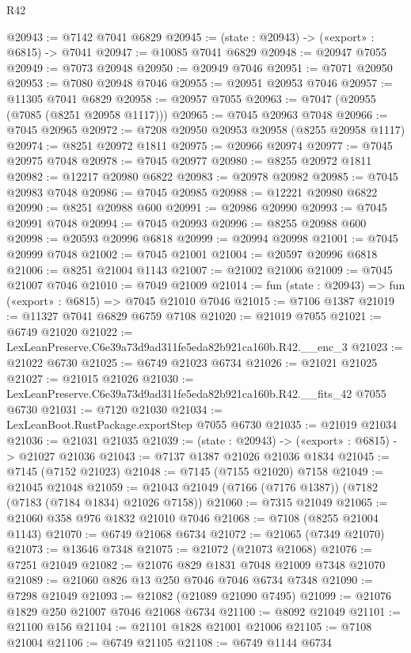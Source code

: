 \begin{lexlean}{R42}
\begin{coremodule}
{@20943 := @7142 @7041 @6829
@20945 := (state : @20943) -> («export» : @6815) -> @7041
@20947 := @10085 @7041 @6829
@20948 := @20947 @7055
@20949 := @7073 @20948
@20950 := @20949 @7046
@20951 := @7071 @20950
@20953 := @7080 @20948 @7046
@20955 := @20951 @20953 @7046
@20957 := @11305 @7041 @6829
@20958 := @20957 @7055
@20963 := @7047 (@20955 (@7085 (@8251 @20958 @1117)))
@20965 := @7045 @20963 @7048
@20966 := @7045 @20965
@20972 := @7208 @20950 @20953 @20958 (@8255 @20958 @1117)
@20974 := @8251 @20972 @1811
@20975 := @20966 @20974
@20977 := @7045 @20975 @7048
@20978 := @7045 @20977
@20980 := @8255 @20972 @1811
@20982 := @12217 @20980 @6822
@20983 := @20978 @20982
@20985 := @7045 @20983 @7048
@20986 := @7045 @20985
@20988 := @12221 @20980 @6822
@20990 := @8251 @20988 @600
@20991 := @20986 @20990
@20993 := @7045 @20991 @7048
@20994 := @7045 @20993
@20996 := @8255 @20988 @600
@20998 := @20593 @20996 @6818
@20999 := @20994 @20998
@21001 := @7045 @20999 @7048
@21002 := @7045 @21001
@21004 := @20597 @20996 @6818
@21006 := @8251 @21004 @1143
@21007 := @21002 @21006
@21009 := @7045 @21007 @7046
@21010 := @7049 @21009
@21014 := fun (state : @20943) => fun («export» : @6815) => @7045 @21010 @7046
@21015 := @7106 @1387
@21019 := @11327 @7041 @6829 @6759 @7108
@21020 := @21019 @7055
@21021 := @6749 @21020
@21022 := LexLeanPreserve.C6e39a73d9ad311fe5eda82b921ca160b.R42.__enc_3
@21023 := @21022 @6730
@21025 := @6749 @21023 @6734
@21026 := @21021 @21025
@21027 := @21015 @21026
@21030 := LexLeanPreserve.C6e39a73d9ad311fe5eda82b921ca160b.R42.__fits_42 @7055 @6730
@21031 := @7120 @21030
@21034 := LexLeanBoot.RustPackage.exportStep @7055 @6730
@21035 := @21019 @21034
@21036 := @21031 @21035
@21039 := (state : @20943) -> («export» : @6815) -> @21027 @21036
@21043 := @7137 @1387 @21026 @21036 @1834
@21045 := @7145 (@7152 @21023)
@21048 := @7145 (@7155 @21020) @7158
@21049 := @21045 @21048
@21059 := @21043 @21049 (@7166 (@7176 @1387)) (@7182 (@7183 (@7184 @1834) @21026 @7158))
@21060 := @7315 @21049
@21065 := @21060 @358 @976 @1832 @21010 @7046
@21068 := @7108 (@8255 @21004 @1143)
@21070 := @6749 @21068 @6734
@21072 := @21065 (@7349 @21070)
@21073 := @13646 @7348
@21075 := @21072 (@21073 @21068)
@21076 := @7251 @21049
@21082 := @21076 @829 @1831 @7048 @21009 @7348 @21070
@21089 := @21060 @826 @13 @250 @7046 @7046 @6734 @7348
@21090 := @7298 @21049
@21093 := @21082 (@21089 @21090 @7495)
@21099 := @21076 @1829 @250 @21007 @7046 @21068 @6734
@21100 := @8092 @21049
@21101 := @21100 @156
@21104 := @21101 @1828 @21001 @21006
@21105 := @7108 @21004
@21106 := @6749 @21105
@21108 := @6749 @1144 @6734
}
\end{coremodule}
\end{lexlean}

